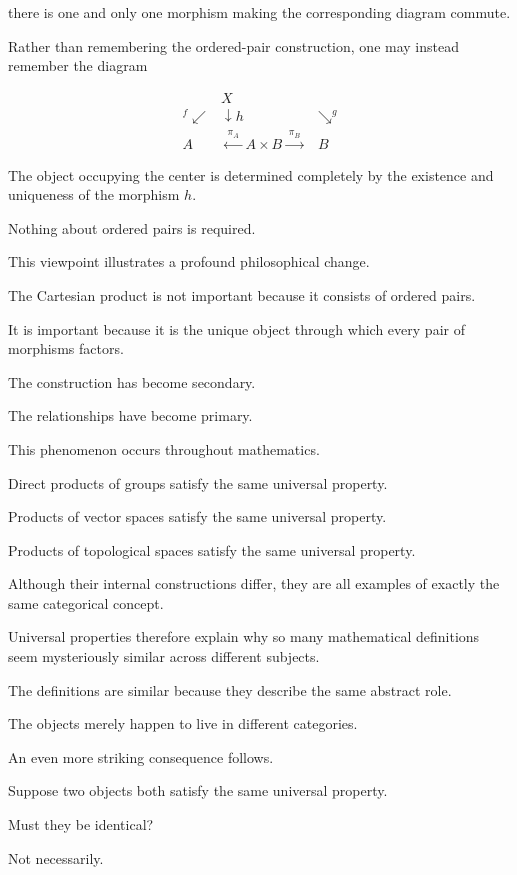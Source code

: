 \documentclass[11pt]{book}
\numberwithin{equation}{chapter}
\theoremstyle{definition}
\theoremstyle{plain}
\theoremstyle{remark}
\begin{document}
there is one and only one morphism making the corresponding diagram commute.

Rather than remembering the ordered-pair construction, one may instead remember the diagram

\[
\begin{array}{ccc}
& X & \\
{}^{f}\swarrow & \downarrow h & \searrow^{g}\\
A & \xleftarrow{\;\pi_A\;} A\times B \xrightarrow{\;\pi_B\;} & B
\end{array}
\]

The object occupying the center is determined completely by the existence and uniqueness of the morphism \(h\).

Nothing about ordered pairs is required.

This viewpoint illustrates a profound philosophical change.

The Cartesian product is not important because it consists of ordered pairs.

It is important because it is the unique object through which every pair of morphisms factors.

The construction has become secondary.

The relationships have become primary.

This phenomenon occurs throughout mathematics.

Direct products of groups satisfy the same universal property.

Products of vector spaces satisfy the same universal property.

Products of topological spaces satisfy the same universal property.

Although their internal constructions differ, they are all examples of exactly the same categorical concept.

Universal properties therefore explain why so many mathematical definitions seem mysteriously similar across different subjects.

The definitions are similar because they describe the same abstract role.

The objects merely happen to live in different categories.

An even more striking consequence follows.

Suppose two objects both satisfy the same universal property.

Must they be identical?

Not necessarily.
\end{document}
